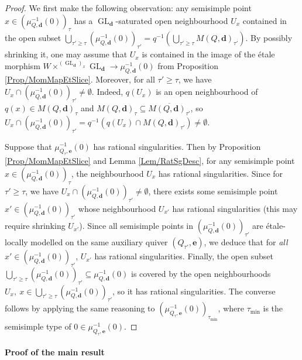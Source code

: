 \documentclass[11pt,english]{article}
\numberwithin{equation}{section}
\numberwithin{figure}{section}
\theoremstyle{definition}
\theoremstyle{plain}
\theoremstyle{remark}
\DeclareMathOperator{\GL}{GL}
\newcommand\dd{\mathbf{d}}
\newcommand\ee{\mathbf{e}}
\begin{document}
\begin{proof}

We first make the following observation: any semisimple point $x\in\left(\mu_{Q,\dd}^{-1}(0)\right)_{\tau}$
has a $\GL_{\dd}$-saturated open neighbourhood $U_{x}$ contained
in the open subset $\bigcup_{\tau'\geq\tau}\left(\mu_{Q,\dd}^{-1}(0)\right)_{\tau'}=q^{-1}\left(\bigcup_{\tau'\geq\tau}M(Q,\dd)_{\tau'}\right)$.
By possibly shrinking it, one may assume that $U_{x}$ is contained
in the image of the étale morphism $W\times^{(\GL_{\dd})_{x}}\GL_{\dd}\rightarrow\mu_{Q,\dd}^{-1}(0)$
from Proposition \ref{Prop/MomMapEtSlice}. Moreover, for all $\tau'\geq\tau$,
we have $U_{x}\cap\left(\mu_{Q,\dd}^{-1}(0)\right)_{\tau'}\ne\emptyset$.
Indeed, $q(U_{x})$ is an open neighbourhood of $q(x)\in M(Q,\dd)_{\tau}$
and $M(Q,\dd)_{\tau}\subseteq\overline{M(Q,\dd)_{\tau'}}$, so $U_{x}\cap\left(\mu_{Q,\dd}^{-1}(0)\right)_{\tau'}=q^{-1}\left(q(U_{x})\cap M(Q,\dd)_{\tau'}\right)\ne\emptyset$.

Suppose that $\mu_{Q_{\tau},\ee}^{-1}(0)$ has rational singularities.
Then by Proposition \ref{Prop/MomMapEtSlice} and Lemma \ref{Lem/RatSgDesc},
for any semisimple point $x\in\left(\mu_{Q,\dd}^{-1}(0)\right)_{\tau}$,
the neighbourhood $U_{x}$ has rational singularities. Since for $\tau'\geq\tau$,
we have $U_{x}\cap\left(\mu_{Q,\dd}^{-1}(0)\right)_{\tau'}\ne\emptyset$,
there exists some semisimple point $x'\in\left(\mu_{Q,\dd}^{-1}(0)\right)_{\tau'}$
whose neighbourhood $U_{x'}$ has rational singularities (this may
require shrinking $U_{x'}$). Since all semisimple points in $\left(\mu_{Q,\dd}^{-1}(0)\right)_{\tau'}$
are étale-locally modelled on the same auxiliary quiver $(Q_{\tau'},\ee)$,
we deduce that for \textit{all} $x'\in\left(\mu_{Q,\dd}^{-1}(0)\right)_{\tau'}$,
$U_{x'}$ has rational singularities. Finally, the open subset $\bigcup_{\tau'\geq\tau}\left(\mu_{Q,\dd}^{-1}(0)\right)_{\tau'}\subseteq\mu_{Q,\dd}^{-1}(0)$
is covered by the open neighbourhoods $U_{x},\ x\in\bigcup_{\tau'\geq\tau}\left(\mu_{Q,\dd}^{-1}(0)\right)_{\tau'}$,
so it has rational singularities. The converse follows by applying
the same reasoning to $\left(\mu_{Q_{\tau},\ee}^{-1}(0)\right)_{\tau_{\min}}$,
where $\tau_{\min}$ is the semisimple type of $0\in\mu_{Q_{\tau},\ee}^{-1}(0)$.
\end{proof}

\paragraph*{Proof of the main result}
\end{document}
